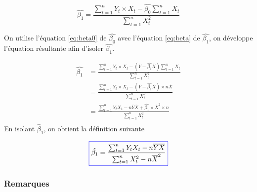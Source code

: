 \documentclass[11pt,french]{report}
\begin{document}
\begin{equation}
\label{eq:beta}
\hat{\beta_1} =  \frac{\sum_{t=1}^n Y_t \times X_t - \hat{\beta_0} \sum_{t=1}^n X_t}{\sum_{t=1}^n X_t^2}
\end{equation}

On utilise l'équation \ref{eq:beta0} de $\hat{\beta_0}$ avec l'équation \ref{eq:beta} de $\hat{\beta_1}$, on développe l'équation résultante afin d'isoler $\hat{\beta_1}$.

\begin{align*}
\hat{\beta_1} &= \frac{\sum_{t=1}^n Y_t \times X_t - (\overline{Y} - \hat{\beta_1}\overline{X})\sum_{t=1}^n X_t}{\sum_{t=1}^n X_t^2} \\
&= \frac{\sum_{t=1}^n Y_t \times X_t - (\overline{Y} - \hat{\beta_1}\overline{X})\times n \overline{X}}{\sum_{t=1}^n X_t^2} \\
&= \frac{\sum_{t=1}^n Y_t X_t - n\overline{Y}\overline{X} + \hat{\beta_1}\times \overline{X}^2 \times n}{\sum_{t=1}^n X_t^2} \\
\end{align*}
En isolant $\hat{\beta}_1$, on obtient la définition suivante

\begin{equation}
\label{eq:beta1}
\color{blue}
\boxed{\color{black}
\hat{\beta_1} = \frac{\sum_{t=1}^n Y_t X_t - n\overline{Y}\overline{X}}{\sum_{t=1}^n X_t^2 - n\overline{X}^2}
}
\end{equation}

\subsubsection*{Remarques}
\end{document}
